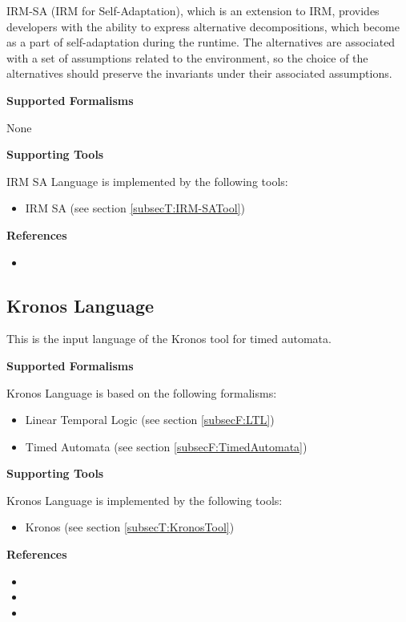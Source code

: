 IRM-SA (IRM for Self-Adaptation), which is an extension to IRM, provides developers with the ability to express alternative decompositions, which become as a part of  self-adaptation during the runtime. The alternatives are associated with a set of assumptions related to the environment, so the choice of the alternatives should preserve the invariants under their associated assumptions.

\textbf{Supported Formalisms}

None


\textbf{Supporting Tools}

IRM SA Language is implemented by the following tools:
\begin{itemize}
	\item IRM SA (see section \ref{subsecT:IRM-SATool})
\end{itemize}


\textbf{References}
\begin{itemize}
	
\item {}
\end{itemize}



\subsection{Kronos Language}
\label{subsecL:KronosLanguage}


This is the input language of the Kronos tool for timed automata.

\textbf{Supported Formalisms}

Kronos Language is based on the following formalisms:
\begin{itemize}
	\item Linear Temporal Logic (see section \ref{subsecF:LTL})
	\item Timed Automata (see section \ref{subsecF:TimedAutomata})
\end{itemize}


\textbf{Supporting Tools}

Kronos Language is implemented by the following tools:
\begin{itemize}
	\item Kronos (see section \ref{subsecT:KronosTool})
\end{itemize}


\textbf{References}
\begin{itemize}
	
\item {}
	
\item {}
	
\item {}
\end{itemize}



